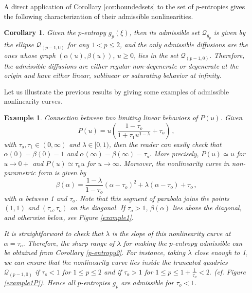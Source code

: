 \documentclass[reqno]{amsart}
\newtheorem{corollary}[lemma]{Corollary}
\newtheorem{example}[lemma]{Example}
\begin{document}
A direct application of Corollary \ref{cor:boundedsets} to the set of $p$-entropies gives the following characterization of their admissible nonlinearities.

\begin{corollary}
Given the $p$-entropy $g_p(\xi)$, then its admissible set $\mathcal{Q}_{g_p}$ is given by the ellipse $\mathcal{Q}_{(p-1,0)}$ for any $1< p\leq 2$, and the only admissible diffusions are the ones whose graph $(\alpha(u),\beta(u))$, $u\ge 0$, lies in the set $\mathcal{Q}_{(p-1,0)}$.
Therefore, the admissible diffusions are either regular non-degenerate or degenerate at the origin and have either linear, sublinear or saturating behavior at infinity. 
\end{corollary}

Let us illustrate the previous results by giving some examples of admissible nonlinearity curves. 

\begin{example}\label{exnon1}
\emph{Connection between two limiting linear behaviors of $P(u)$.} Given 
\begin{equation}\label{par-segmP}
P(u)=u\left( \frac{1-\tau_o}{1+\tau_1 u^{1-\lambda}}+\tau_o \right)\,,
\end{equation}
with $\tau_o,\tau_1\in (0,\infty)$ and $\lambda\in [0,1)$, then the reader can easily check that
$\alpha(0)=\beta(0)=1$ and $\alpha(\infty)=\beta(\infty)=\tau_o$. More precisely, $P(u)\simeq u$ for $u\to 0+$ and $P(u)\simeq \tau_o u$ for $u\to\infty$. Moreover, the nonlinearity curve in non-parametric form is given by 
\begin{equation}\label{par-segm}
  \beta(\alpha)=\frac{1-\lambda}{1-\tau_o}(\alpha-\tau_o)^2 + \lambda (\alpha-\tau_o) + \tau_o\,,
\end{equation}
with $\alpha$ between 1 and $\tau_o$. Note that this segment of parabola joins the points $(1,1)$ and $(\tau_o,\tau_o)$ on the diagonal. If $\tau_o>1$, $\beta(\alpha)$ lies above the diagonal, and otherwise below, see Figure \ref{example1}. 

It is straightforward to check that $\lambda$ is the slope of this nonlinearity curve at $\alpha=\tau_o$. Therefore, the sharp range of $\lambda$ for making the $p$-entropy admissible can be obtained from Corollary \ref{p-entropy2}. For instance, taking $\lambda$ close enough to 1, we can ensure that the nonlinearity curve lies inside the truncated quadrics $\mathcal{Q}_{(p-1,0)}$ if $\tau_o<1$ for $1\leq p\leq 2$ and if $\tau_o>1$ for $1\leq p \le 1+\frac1{\tau_o}<2$.  
(cf. Figure \ref{example1P}). Hence all $p$-entropies $g_p$ are admissible for $\tau_o<1$.
\end{example}
\end{document}
